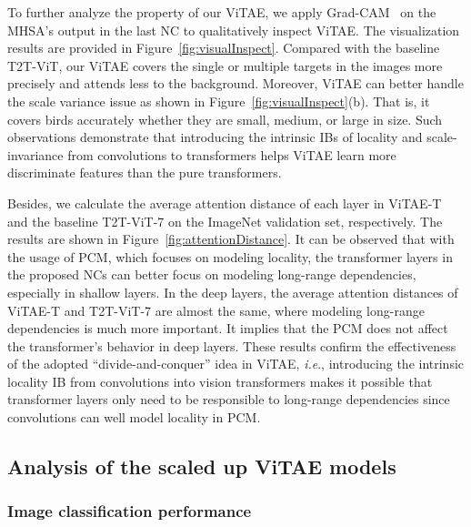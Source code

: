 \documentclass[twocolumn]{svjour3}          \smartqed  \usepackage{natbib}
\newcommand{\ie}{i.e}
\def\onedot{.\xspace}
\def\ie{\emph{i.e}\onedot}
\begin{document}
To further analyze the property of our ViTAE, we apply Grad-CAM~\citep{selvaraju2017grad} on the MHSA's output in the last NC to qualitatively inspect ViTAE. The visualization results are provided in Figure~\ref{fig:visualInspect}. Compared with the baseline T2T-ViT, our ViTAE covers the single or multiple targets in the images more precisely and attends less to the background. Moreover, ViTAE can better handle the scale variance issue as shown in Figure~\ref{fig:visualInspect}(b). That is, it covers birds accurately whether they are small, medium, or large in size. Such observations demonstrate that introducing the intrinsic IBs of locality and scale-invariance from convolutions to transformers helps ViTAE learn more discriminate features than the pure transformers.

Besides, we calculate the average attention distance of each layer in ViTAE-T and the baseline T2T-ViT-7 on the ImageNet validation set, respectively. The results are shown in Figure~\ref{fig:attentionDistance}. It can be observed that with the usage of PCM, which focuses on modeling locality, the transformer layers in the proposed NCs can better focus on modeling long-range dependencies, especially in shallow layers. In the deep layers, the average attention distances of ViTAE-T and T2T-ViT-7 are almost the same, where modeling long-range dependencies is much more important. It implies that the PCM does not affect the transformer's behavior in deep layers. These results confirm the effectiveness of the adopted ``divide-and-conquer'' idea in ViTAE, \ie, introducing the intrinsic locality IB from convolutions into vision transformers makes it possible that transformer layers only need to be responsible to long-range dependencies since convolutions can well model locality in PCM. 

\subsection{Analysis of the scaled up ViTAE models}
\subsubsection{Image classification performance}
\end{document}
